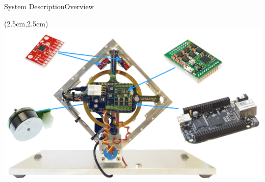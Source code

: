 \begin{frame}{System Description}{Overview}

\begin{textblock*}{15cm}(2.5cm,2.5cm)
	  	\includegraphics[scale=0.235]{Pictures/sysDescribtionTotal.pdf}
\end{textblock*}
	  
%  
%  
%

\end{frame}

